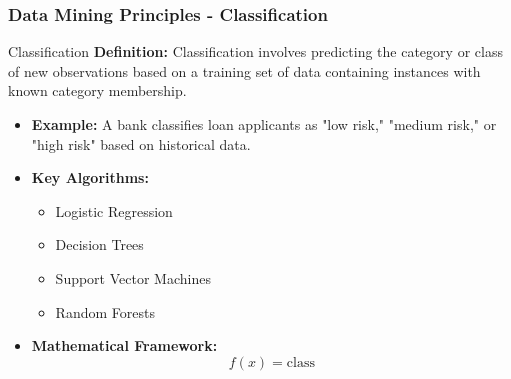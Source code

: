 \documentclass[aspectratio=169]{beamer}
\begin{document}
\begin{frame}[fragile]
    \frametitle{Data Mining Principles - Classification}
    \begin{block}{Classification}
        \textbf{Definition:} Classification involves predicting the category or class of new observations based on a training set of data containing instances with known category membership.
    \end{block}
    \begin{itemize}
        \item \textbf{Example:} A bank classifies loan applicants as "low risk," "medium risk," or "high risk" based on historical data.
        
        \item \textbf{Key Algorithms:}
        \begin{itemize}
            \item Logistic Regression
            \item Decision Trees
            \item Support Vector Machines
            \item Random Forests
        \end{itemize}
        
        \item \textbf{Mathematical Framework:}
        \begin{equation}
            f(x) = \text{class}
        \end{equation}
    \end{itemize}
\end{frame}
\end{document}
